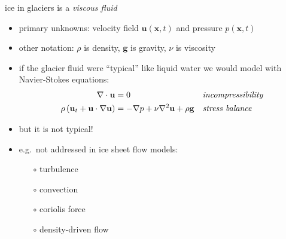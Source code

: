\documentclass{beamer}
\newcommand{\bx}{\mathbf{x}}
\begin{document}
\begin{frame}{ice in glaciers is a \emph{viscous fluid}}

\begin{itemize}
\item primary unknowns: velocity field $\mathbf{u}(\bx,t)$ and pressure $p(\bx,t)$
\item other notation: $\rho$ is density, $\mathbf{g}$ is gravity, $\nu$ is viscosity
\item if the glacier fluid were ``typical'' like liquid water we would model with Navier-Stokes equations:
\begin{align*}
\nabla \cdot \mathbf{u} &= 0 &&\text{\emph{incompressibility}} \\
\rho \left(\mathbf{u}_t + \mathbf{u}\cdot\nabla \mathbf{u}\right) &= -\nabla p + \nu \nabla^2 \mathbf{u} + \rho \mathbf{g} &&\text{\emph{stress balance}}
\end{align*}
\item but it is not typical!
\item e.g.~not addressed in ice sheet flow models:
  \begin{itemize}
  \item[$\circ$] turbulence
  \item[$\circ$] convection
  \item[$\circ$] coriolis force
  \item[$\circ$] density-driven flow
  \end{itemize}
\end{itemize}
\end{frame}
\end{document}
